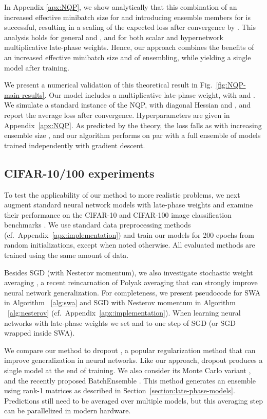 \documentclass{article} \usepackage{iclr2021_conference,times}
\begin{document}
In Appendix \ref{apx:NQP}, we show analytically that this combination of an increased effective minibatch size for  and introducing  ensemble members for  is successful, resulting in a scaling of the expected loss after convergence by . This analysis holds for general  and , and for both scalar and hypernetwork multiplicative late-phase weights. Hence, our approach combines the benefits of an increased effective minibatch size and of ensembling, while yielding a single model after training.


We present a numerical validation of this theoretical result in Fig.~\ref{fig:NQP-main-results}. Our model includes a multiplicative late-phase weight,  with  and . We simulate a standard instance of the NQP, with diagonal Hessian  and  \citep[cf.][]{zhang_which_2019}, and report the average loss after convergence. Hyperparameters are given in Appendix~\ref{apx:NQP}. As predicted by the theory, the loss falls as  with increasing ensemble size , and our algorithm performs on par with a full ensemble of  models trained independently with gradient descent.


\vspace{-0.15cm}
\subsection{CIFAR-10/100 experiments}
To test the applicability of our method to more realistic problems, we next augment standard neural network models with late-phase weights and examine their performance on the CIFAR-10 and CIFAR-100 image classification benchmarks \citep{krizhevsky_learning_2009}. We use standard data preprocessing methods (cf.~Appendix~\ref{apx:implementation}) and train our models for 200 epochs from random initializations, except when noted otherwise. All evaluated methods are trained using the same amount of data.

Besides SGD (with Nesterov momentum), we also investigate stochastic weight averaging \citep[SWA;][]{izmailov_averaging_2018}, a recent reincarnation of Polyak averaging \citep{polyak_acceleration_1992} that can strongly improve neural network generalization. For completeness, we present pseudocode for SWA in Algorithm ~\ref{alg:swa} and SGD with Nesterov momentum in Algorithm ~\ref{alg:nesterov} (cf.~Appendix~\ref{apx:implementation}). When learning neural networks with late-phase weights we set  and  to one step of SGD (or SGD wrapped inside SWA). 

We compare our method to dropout  \citep{srivastava_dropout_2014}, a popular regularization method that can improve generalization in neural networks. Like our approach, dropout produces a single model at the end of training. We also consider its Monte Carlo variant \citep[MC-dropout;][]{gal_dropout_2016}, and the recently proposed BatchEnsemble \citep{wen_batchensemble_2020}. This method generates an ensemble using rank-1 matrices as described in Section~\ref{section:late-phase-models}. Predictions still need to be averaged over multiple models, but this averaging step can be parallelized in modern hardware.
\end{document}
